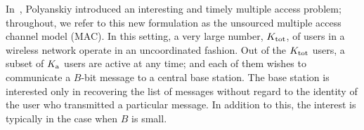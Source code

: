 \newif\iflonger
\longerfalse

\newif\ifolder
\olderfalse


\def\Figurespath{./data/MA}



In~\cite{polyanskiy2017perspective}, Polyanskiy introduced an interesting and timely multiple access problem; throughout, we refer to this new formulation as the unsourced multiple access channel model (MAC). In this setting, a very large number, $K_{\text{tot}}$, of users in a wireless network operate in an uncoordinated fashion. Out of the $K_{\text{tot}}$ users, a subset of $K_{\text{a}}$ users are active at any time; and each of them wishes to communicate a $B$-bit message to a central base station. The base station is interested only in recovering the list of messages without regard to the identity of the user who transmitted a particular message. In addition to this, the interest is typically in the case when $B$ is small.

